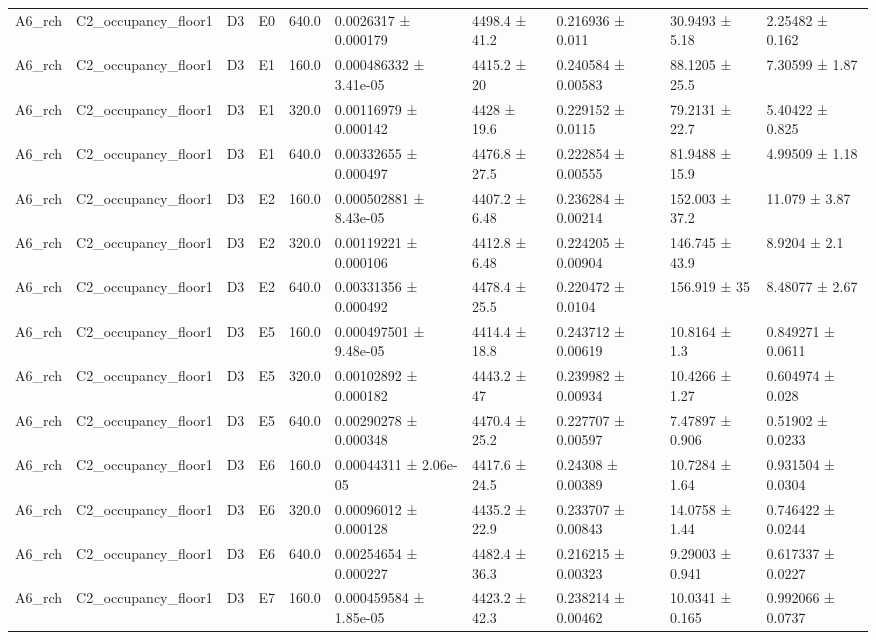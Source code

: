 \begin{table}
\begin{tabular}{llllllllll}
A6\_rch & C2\_occupancy\_floor1 & D3 & E0 & 640.0 & 0.0026317 ± 0.000179 & 4498.4 ± 41.2 & 0.216936 ± 0.011 & 30.9493 ± 5.18 & 2.25482 ± 0.162 \\
A6\_rch & C2\_occupancy\_floor1 & D3 & E1 & 160.0 & 0.000486332 ± 3.41e-05 & 4415.2 ± 20 & 0.240584 ± 0.00583 & 88.1205 ± 25.5 & 7.30599 ± 1.87 \\
A6\_rch & C2\_occupancy\_floor1 & D3 & E1 & 320.0 & 0.00116979 ± 0.000142 & 4428 ± 19.6 & 0.229152 ± 0.0115 & 79.2131 ± 22.7 & 5.40422 ± 0.825 \\
A6\_rch & C2\_occupancy\_floor1 & D3 & E1 & 640.0 & 0.00332655 ± 0.000497 & 4476.8 ± 27.5 & 0.222854 ± 0.00555 & 81.9488 ± 15.9 & 4.99509 ± 1.18 \\
A6\_rch & C2\_occupancy\_floor1 & D3 & E2 & 160.0 & 0.000502881 ± 8.43e-05 & 4407.2 ± 6.48 & 0.236284 ± 0.00214 & 152.003 ± 37.2 & 11.079 ± 3.87 \\
A6\_rch & C2\_occupancy\_floor1 & D3 & E2 & 320.0 & 0.00119221 ± 0.000106 & 4412.8 ± 6.48 & 0.224205 ± 0.00904 & 146.745 ± 43.9 & 8.9204 ± 2.1 \\
A6\_rch & C2\_occupancy\_floor1 & D3 & E2 & 640.0 & 0.00331356 ± 0.000492 & 4478.4 ± 25.5 & 0.220472 ± 0.0104 & 156.919 ± 35 & 8.48077 ± 2.67 \\
A6\_rch & C2\_occupancy\_floor1 & D3 & E5 & 160.0 & 0.000497501 ± 9.48e-05 & 4414.4 ± 18.8 & 0.243712 ± 0.00619 & 10.8164 ± 1.3 & 0.849271 ± 0.0611 \\
A6\_rch & C2\_occupancy\_floor1 & D3 & E5 & 320.0 & 0.00102892 ± 0.000182 & 4443.2 ± 47 & 0.239982 ± 0.00934 & 10.4266 ± 1.27 & 0.604974 ± 0.028 \\
A6\_rch & C2\_occupancy\_floor1 & D3 & E5 & 640.0 & 0.00290278 ± 0.000348 & 4470.4 ± 25.2 & 0.227707 ± 0.00597 & 7.47897 ± 0.906 & 0.51902 ± 0.0233 \\
A6\_rch & C2\_occupancy\_floor1 & D3 & E6 & 160.0 & 0.00044311 ± 2.06e-05 & 4417.6 ± 24.5 & 0.24308 ± 0.00389 & 10.7284 ± 1.64 & 0.931504 ± 0.0304 \\
A6\_rch & C2\_occupancy\_floor1 & D3 & E6 & 320.0 & 0.00096012 ± 0.000128 & 4435.2 ± 22.9 & 0.233707 ± 0.00843 & 14.0758 ± 1.44 & 0.746422 ± 0.0244 \\
A6\_rch & C2\_occupancy\_floor1 & D3 & E6 & 640.0 & 0.00254654 ± 0.000227 & 4482.4 ± 36.3 & 0.216215 ± 0.00323 & 9.29003 ± 0.941 & 0.617337 ± 0.0227 \\
A6\_rch & C2\_occupancy\_floor1 & D3 & E7 & 160.0 & 0.000459584 ± 1.85e-05 & 4423.2 ± 42.3 & 0.238214 ± 0.00462 & 10.0341 ± 0.165 & 0.992066 ± 0.0737 \\

\end{tabular}
\end{table}
